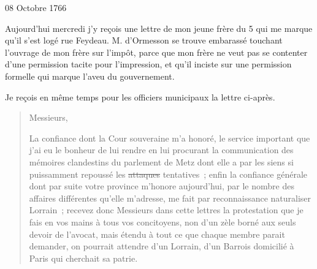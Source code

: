                      \begin{diary}{08 Octobre 1766}{}
                        
                         Aujourd'hui mercredi j’y reçois une
                           lettre
                           de mon jeune frère du
                              5 qui me marque qu’il
                           s’est logé rue Feydeau. M.
                              d’Ormesson se trouve
                           embarassé touchant l’ouvrage de mon
                              frère sur l’impôt, parce que mon frère
                           ne veut pas se contenter d’une permission
                           tacite pour l’impression, et qu’il inciste
                           sur une permission formelle qui marque
                           l’aveu du gouvernement. \bigskip
        
        
                         Je reçois en même temps pour les officiers
                           municipaux la lettre ci-après. \bigskip
        
        
                        \begin{quote}Messieurs,\bigskip
                    
                    
                              La confiance dont la Cour
                                 souveraine m’a honoré,
                              le service important que j’ai eu le bonheur de
                              lui rendre en lui procurant la communication
                              des mémoires clandestins du parlement de Metz
                              dont elle a par les siens si puissamment
                              repoussé les \sout{attaques}
                              tentatives ; enfin la
                              confiance générale dont par suite votre province m’honore aujourd'hui, par
                              le nombre
                              des affaires différentes qu’elle m’adresse, me fait
                              par reconnaissance naturaliser Lorrain ; recevez
                              donc Messieurs dans cette lettres la protestation
                              que je fais en vos mains à tous vos concitoyens,
                              non d’un zèle borné aux seuls devoir de l’avocat,
                              mais étendu à tout ce que chaque membre parait
                              demander, on pourrait attendre d’un Lorrain,
                              d’un Barrois domicilié à Paris qui cherchait
                              sa patrie. \bigskip
        

\end{quote}
\end{diary}
